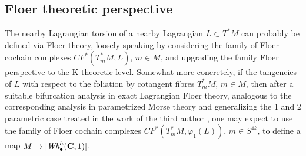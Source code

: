 \documentclass{amsart}
\newcommand\cQ{\mathcal{Q}}
\newcommand\cT{\mathcal{T}}
\def\bC{\mathbf{C}}
\def\bR{\mathbf{R}}
\def\bZ{\mathbf{Z}}
\theoremstyle{definition}
\theoremstyle{remark}
\newtheorem{inductive lemma}[theorem]{Inductive Lemma}
\begin{document}

\subsection{Floer theoretic perspective}\label{sec: hol}

The nearby Lagrangian torsion of a nearby Lagrangian $L \subset T^*M$ can probably be defined via Floer theory, loosely speaking by considering the family of Floer cochain complexes $CF^*(T^*_mM,L)$, $m \in M$, and upgrading the family Floer perspective to the K-theoretic level. Somewhat more concretely, if the tangencies of $L$ with respect to the foliation by cotangent fibres $T^*_mM$, $m \in M$, then after a suitable bifurcation analysis in exact Lagrangian Floer theory, analogous to the corresponding analysis in parametrized Morse theory and generalizing the 1 and 2 parametric case treated in the work of the third author \cite{S02}, one may expect to use the family of Floer cochain complexes $CF^*(T^*_m M,\varphi_1(L))$, $m \in S^{4k}$, to define a map $M \to  |\text{\em Wh}_\bullet^h(\bC,1)|$.
\end{document}
